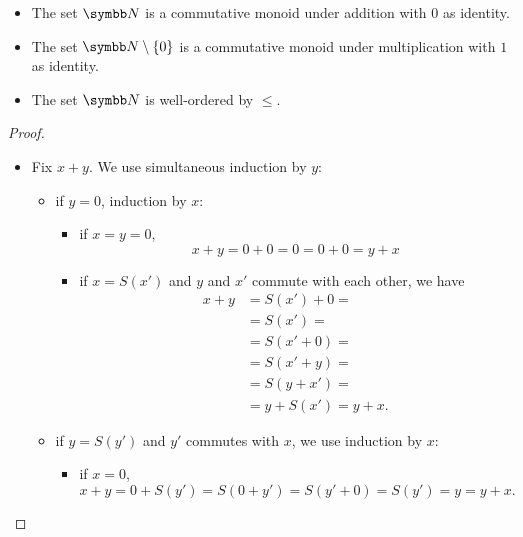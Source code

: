 \begin{proposition}\label{def:natural_numbers_semiring}
  \begin{itemize}\mbox{}
    \item The set \( \BB{N} \) is a commutative monoid under addition with \( 0 \) as identity.
    \item The set \( \BB{N} \setminus \{ 0 \} \) is a commutative monoid under multiplication with \( 1 \) as identity.
    \item The set \( \BB{N} \) is well-ordered by \( \leq \).
  \end{itemize}
\end{proposition}
\begin{proof}
  \begin{itemize}\mbox{}
    \item Fix \( x + y \). We use simultaneous induction by \( y \):
    \begin{itemize}
      \item if \( y = 0 \), induction by \( x \):
      \begin{itemize}
        \item if \( x = y = 0 \),
        \begin{equation*}
          x + y = 0 + 0 = 0 = 0 + 0 = y + x
        \end{equation*}

        \item if \( x = S(x') \) and \( y \) and \( x' \) commute with each other, we have
        \begin{align*}
          x + y
          &=
          S(x') + 0
          = \\ &=
          S(x')
          = \\ &=
          S(x' + 0)
          = \\ &=
          S(x' + y)
          = \\ &=
          S(y + x')
          = \\ &=
          y + S(x')
          =
          y + x.
        \end{align*}
      \end{itemize}

      \item if \( y = S(y') \) and \( y' \) commutes with \( x \), we use induction by \( x \):
      \begin{itemize}
        \item if \( x = 0 \),
        \begin{equation*}
          x + y = 0 + S(y') = S(0 + y') = S(y' + 0) = S(y') = y = y + x.
        \end{equation*}


\end{itemize}
\end{itemize}
\end{itemize}
\end{proof}
